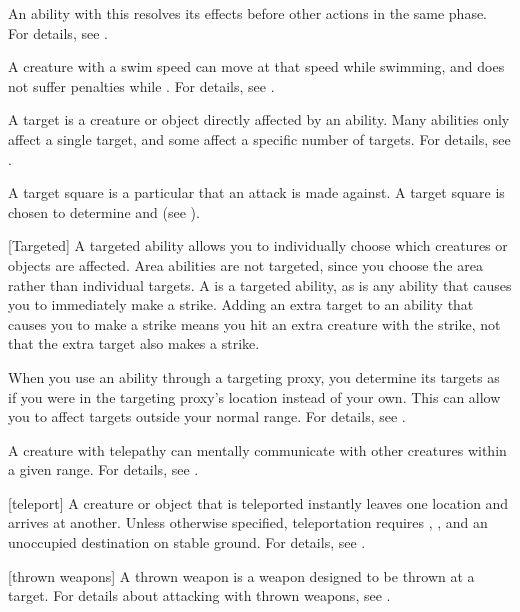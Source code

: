  An ability with this  resolves its effects before other actions in the same phase.
For details, see .

 A creature with a swim speed can move at that speed while swimming, and does not suffer penalties while \submerged.
For details, see .

 A target is a creature or object directly affected by an ability.
Many abilities only affect a single target, and some affect a specific number of targets.
For details, see .

 A target square is a particular  that an attack is made against.
A target square is chosen to determine  and  (see ).

[Targeted] A targeted ability allows you to individually choose which creatures or objects are affected.
Area abilities are not targeted, since you choose the area rather than individual targets.
A  is a targeted ability, as is any ability that causes you to immediately make a strike.
Adding an extra target to an ability that causes you to make a strike means you hit an extra creature with the strike, not that the extra target also makes a strike.

 When you use an ability through a targeting proxy, you determine its targets as if you were in the targeting proxy's location instead of your own.
This can allow you to affect targets outside your normal range.
For details, see .

 A creature with telepathy can mentally communicate with other creatures within a given range.
For details, see .

[teleport] A creature or object that is teleported instantly leaves one location and arrives at another.
Unless otherwise specified, teleportation requires , , and an unoccupied destination on stable ground.
For details, see .

[thrown weapons] A thrown weapon is a weapon designed to be thrown at a target.
For details about attacking with thrown weapons, see .

